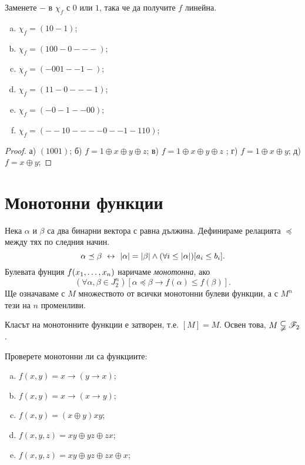 \begin{problem}
  Заменете $-$ в $\chi_f$ с $0$ или $1$, така че да получите $f$ линейна.
  \begin{enumerate}[a)]
  \item
    $\chi_f = (10-1)$;
  \item
    $\chi_f = (100-0---)$;
  \item
    $\chi_f = (-001--1-)$;
  \item
    $\chi_f = (11-0---1)$;
  \item
    $\chi_f = (-0-1--00)$;
  \item
    $\chi_f = (--10----0--1-110)$;
  \end{enumerate}
\end{problem}
\begin{proof}
  а) $(1001)$; б) $f = 1\oplus x \oplus y\oplus z$; в) $f = 1\oplus x\oplus y\oplus z$ ;
  г) $f = 1\oplus x\oplus y$; д) $f = x\oplus y$;
\end{proof}


\section{Монотонни функции}

Нека $\alpha$ и $\beta$ са два бинарни вектора с равна дължина.
Дефинираме релацията $\preceq$ между тях по следния начин.
\[\alpha \preceq \beta \ \leftrightarrow\  \vert{\alpha}\vert = \vert{\beta}\vert\wedge (\forall i \leq \vert{\alpha}\vert)[a_i \leq b_i].\]
Булевата фунция $f(x_{1},\dots,x_{n})$ наричаме {\em монотонна}, ако 
\[(\forall \alpha,\beta\in J^n_2 )[\alpha\preceq\beta \rightarrow f(\alpha) \leq f(\beta)].\]
Ще означаваме с $M$ множеството от всички монотонни булеви функции, а с $M^n$ тези на $n$ променливи.

\begin{prop}
  Класът на монотонните функции е затворен, т.е. $[M] = M$.
  Освен това, $M \subsetneqq \mathscr{F}_2$.
\end{prop}


\begin{problem}
  Проверете монотонни ли са функциите:
  \begin{enumerate}[a)]
  \item
    $f(x,y) = x\rightarrow (y\rightarrow x)$;
  \item
    $f(x,y) = x\rightarrow (x\rightarrow y)$;
  \item
    $f(x,y) = (x\oplus y)xy$;
  \item
    $f(x,y,z) = xy\oplus yz \oplus zx$;
  \item
    $f(x,y,z) = xy\oplus yz \oplus zx \oplus x$;
  \end{enumerate}
\end{problem}

